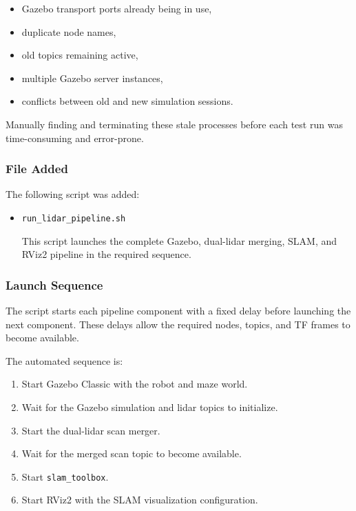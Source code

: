 \documentclass{article}
\begin{document}
\begin{itemize}
    \item Gazebo transport ports already being in use,
    \item duplicate node names,
    \item old topics remaining active,
    \item multiple Gazebo server instances,
    \item conflicts between old and new simulation sessions.
\end{itemize}

Manually finding and terminating these stale processes before each test run was time-consuming and error-prone.

\subsubsection{File Added}

The following script was added:

\begin{itemize}
    \item \texttt{run\_lidar\_pipeline.sh}

    This script launches the complete Gazebo, dual-lidar merging, SLAM, and RViz2 pipeline in the required sequence.
\end{itemize}

\subsubsection{Launch Sequence}

The script starts each pipeline component with a fixed delay before launching the next component. These delays allow the required nodes, topics, and TF frames to become available.

The automated sequence is:

\begin{enumerate}
    \item Start Gazebo Classic with the robot and maze world.
    \item Wait for the Gazebo simulation and lidar topics to initialize.
    \item Start the dual-lidar scan merger.
    \item Wait for the merged scan topic to become available.
    \item Start \texttt{slam\_toolbox}.
    \item Start RViz2 with the SLAM visualization configuration.
\end{enumerate}
\end{document}
